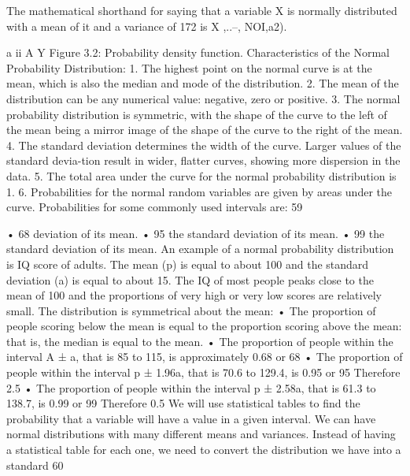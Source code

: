 
The mathematical shorthand for saying that a variable X is normally distributed with a mean 
of it and a variance of 172 is X ,..--, NOI,a2). 

a 
ii 
A 
Y 
Figure 3.2: Probability density function. 
Characteristics of the Normal Probability Distribution: 1. The highest point on the normal curve is at the mean, which is also the median and mode of the distribution. 2. The mean of the distribution can be any numerical value: negative, zero or positive. 3. The normal probability distribution is symmetric, with the shape of the curve to the left of the mean being a mirror image of the shape of the curve to the right of the mean. 4. The standard deviation determines the width of the curve. Larger values of the standard devia-tion result in wider, flatter curves, showing more dispersion in the data. 5. The total area under the curve for the normal probability distribution is 1. 6. Probabilities for the normal random variables are given by areas under the curve. Probabilities for some commonly used intervals are: 
59 


• 68%
deviation of its mean. 
• 95%
the standard deviation of its mean. 
• 99%
the standard deviation of its mean. 
An example of a normal probability distribution is IQ score of adults. The mean (p) is equal to about 100 and the standard deviation (a) is equal to about 15. The IQ of most people peaks close to the mean of 100 and the proportions of very high or very low scores are relatively small. The distribution is symmetrical about the mean: 
• The proportion of people scoring below the mean is equal to the proportion scoring above the 
mean: that is, the median is equal to the mean. 
• The proportion of people within the interval A ± a, that is 85 to 115, is approximately 0.68 or 
68%
• The proportion of people within the interval p ± 1.96a, that is 70.6 to 129.4, is 0.95 or 95%
Therefore 2.5%
• The proportion of people within the interval p ± 2.58a, that is 61.3 to 138.7, is 0.99 or 99%
Therefore 0.5%
We will use statistical tables to find the probability that a variable will have a value in a given interval. We can have normal distributions with many different means and variances. Instead of having a statistical table for each one, we need to convert the distribution we have into a standard 
60 

